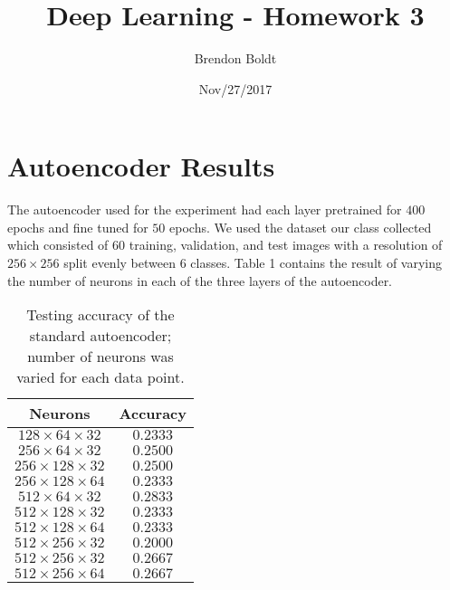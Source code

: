 \documentclass[a4paper]{article}
\title{Deep Learning - Homework 3}
\author{Brendon Boldt}
\date{Nov/27/2017}
\begin{document}

\maketitle

%
\iffalse
\begin{lstlisting}
\end{lstlisting}
\fi

\section{Autoencoder Results}


The autoencoder used for the experiment had each layer pretrained for $400$
epochs and fine tuned for $50$ epochs. We used the dataset our class collected
which consisted of $60$ training, validation, and test images with a resolution
of $256\times256$ split evenly between $6$  classes.
Table 1 contains the result of varying the number of neurons in each of the
three layers of the autoencoder.

\begin{table}[h]
 \caption{Testing accuracy of the standard autoencoder;
 number of neurons was varied for each data point.}
 \label{table}
 \begin{center}
  \begin{tabular}{c|c}
    \hline \hline
    Neurons & Accuracy \\
    \hline
    $128\times 64\times 32$ & $ 0.2333 $ \\
    $256\times 64\times 32$ & $ 0.2500 $ \\
    $256\times 128\times 32$ & $ 0.2500 $ \\
    $256\times 128\times 64$ & $ 0.2333 $ \\
    $512\times 64\times 32$  & $ 0.2833 $ \\
    $512\times 128\times 32$ & $ 0.2333 $ \\
    $512\times 128\times 64$ & $ 0.2333 $ \\
    $512\times 256\times 32$ & $ 0.2000 $ \\
    $512\times 256\times 32$ & $ 0.2667 $ \\
    $512\times 256\times 64$ & $ 0.2667 $
  \end{tabular}
 \end{center}
\end{table}
\end{document}
